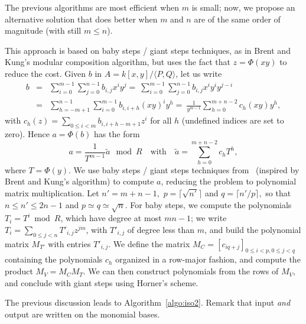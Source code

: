 \documentclass{sig-alternate}
\newcounter{algo}
\newcommand{\ang}[1]{\langle#1\rangle}
\begin{document}
\vspace{-2ex}   The previous
algorithms are most efficient when $m$ is small; now, we propose an
alternative solution that does better when $m$ and $n$ are of the same
order of magnitude (with still $m \le n$).

This approach is based on baby steps / giant steps techniques, as in
Brent and Kung's modular composition algorithm, but uses the fact that
$z=\Phi(xy)$ to reduce the cost. Given $b$ in $A=k[x,y]/\ang{P,Q}$,
let us write
\begin{eqnarray*}
b&=&\sum_{i=0}^{m-1}\sum_{j=0}^{n-1} b_{i,j}x^i y^j
=~\sum_{i=0}^{m-1}\sum_{j=0}^{n-1} b_{i,j}x^i y^i y^{j-i}\\
&=&\sum_{h=-m+1}^{n-1}\sum_{i=0}^{m-1} b_{i,i+h}(xy)^i y^h
=~\frac{1}{y^{m-1}} \sum_{h=0}^{m+n-2} c_h(xy) y^h,
\end{eqnarray*}
with $c_h(z)=\sum_{0 \le i < m} b_{i,i+h-m+1} z^i$ for all
$h$ (undefined indices are set to zero). Hence $a=\Phi(b)$ has the
form
$$a = \frac{1}{T^{m-1}}\widetilde{a} \mod R\quad\text{with}\quad
\widetilde{a}=\sum_{h=0}^{m+n-2} c_h T^h,$$ where
$T=\Phi(y)$.  We use baby steps / giant steps techniques
from~\cite{LeMeSc13} (inspired by Brent and Kung's algorithm) to
compute $a$, reducing the problem to polynomial matrix
multiplication. Let $n'=m+n-1,$ $p=\lceil \sqrt {n'} \rceil$ and $
q=\lceil n'/p\rceil,$ so that $n \le n' \le 2n-1$ and $p\simeq q
\simeq \sqrt{n}$.  For baby steps, we compute the polynomials $T_i=T^i
\bmod R$, which have degree at most $mn-1$; we write $T_i = \sum_{0
  \le j < n} T'_{i,j} z^{jm}$, with $T'_{i,j}$ of degree less than
$m$, and build the polynomial matrix $M_{T'}$ with entries $T'_{i,j}$.
We define the matrix $M_C=[c_{iq+j}]_{0 \le i <p, 0 \le j < q}$
containing the polynomials $c_h$ organized in a row-major fashion,
and compute the product $M_V=M_C M_T$. We can then construct
polynomials from the rows of $M_V$, and conclude with giant steps
using Horner's scheme.

The previous discussion leads to Algorithm~\ref{algo:iso2}. Remark
that input {\em and} output are written on the monomial bases.
\end{document}
